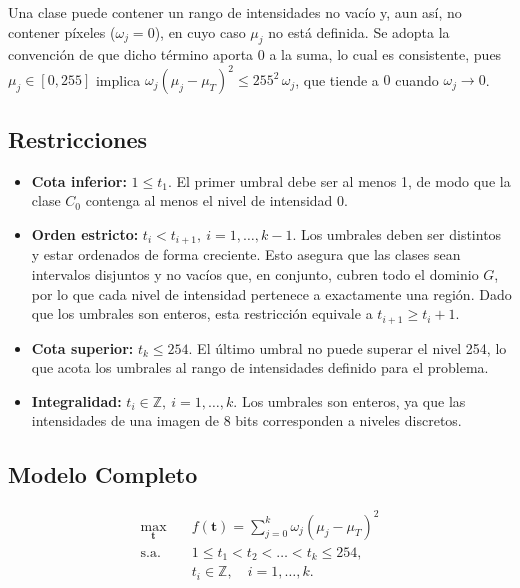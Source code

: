 \documentclass[letter, 10pt]{article}
\begin{document}
Una clase puede contener un rango de intensidades no vac\'io y, aun as\'i, no contener p\'ixeles ($\omega_j = 0$), en cuyo caso $\mu_j$ no est\'a definida. Se adopta la convenci\'on de que dicho t\'ermino aporta $0$ a la suma, lo cual es consistente, pues $\mu_j \in [0, 255]$ implica $\omega_j (\mu_j - \mu_T)^2 \leq 255^2\, \omega_j$, que tiende a $0$ cuando $\omega_j \to 0$.

\subsection{Restricciones}
\begin{itemize}
    \item \textbf{Cota inferior:} $1 \leq t_1$. El primer umbral debe ser al menos 1, de modo que la clase $C_0$ contenga al menos el nivel de intensidad 0.
    \item \textbf{Orden estricto:} $t_i < t_{i+1}, \ i = 1, \dots, k-1$. Los umbrales deben ser distintos y estar ordenados de forma creciente. Esto asegura que las clases sean intervalos disjuntos y no vac\'ios que, en conjunto, cubren todo el dominio $G$, por lo que cada nivel de intensidad pertenece a exactamente una regi\'on. Dado que los umbrales son enteros, esta restricci\'on equivale a $t_{i+1} \geq t_i + 1$.
    \item \textbf{Cota superior:} $t_k \leq 254$. El \'ultimo umbral no puede superar el nivel 254, lo que acota los umbrales al rango de intensidades definido para el problema.
    \item \textbf{Integralidad:} $t_i \in \mathbb{Z}, \ i = 1, \dots, k$. Los umbrales son enteros, ya que las intensidades de una imagen de 8 bits corresponden a niveles discretos.
\end{itemize}

\subsection{Modelo Completo}
\begin{equation}
    \begin{aligned}
        \max_{\mathbf{t}} \quad & f(\mathbf{t}) = \sum_{j=0}^{k} \omega_j \left( \mu_j - \mu_T \right)^2 \\
        \text{s.a.} \quad & 1 \leq t_1 < t_2 < \dots < t_k \leq 254, \\
        & t_i \in \mathbb{Z}, \quad i = 1, \dots, k.
    \end{aligned}
\end{equation}
\end{document}
